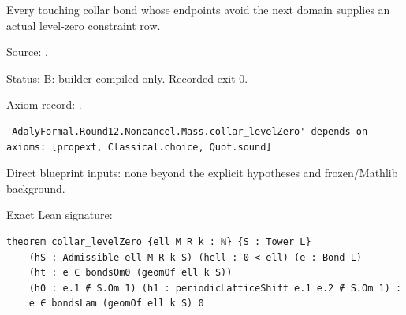 \begin{theorem}[bp-211]
\label{bp-211}
\uses{}
\leanok
Every touching collar bond whose endpoints avoid the next domain supplies an actual level-zero constraint row.

\par Source: \texttt{}.
\par Status: B: builder-compiled only. Recorded exit 0.
\par Axiom record: \texttt{}.
\begin{verbatim}
'AdalyFormal.Round12.Noncancel.Mass.collar_levelZero' depends on axioms: [propext, Classical.choice, Quot.sound]
\end{verbatim}
\par Direct blueprint inputs: none beyond the explicit hypotheses and frozen/Mathlib background.
\par Exact Lean signature:
\begin{verbatim}
theorem collar_levelZero {ell M R k : ℕ} {S : Tower L}
    (hS : Admissible ell M R k S) (hell : 0 < ell) (e : Bond L)
    (ht : e ∈ bondsOm0 (geomOf ell k S))
    (h0 : e.1 ∉ S.Om 1) (h1 : periodicLatticeShift e.1 e.2 ∉ S.Om 1) :
    e ∈ bondsLam (geomOf ell k S) 0
\end{verbatim}
\end{theorem}

